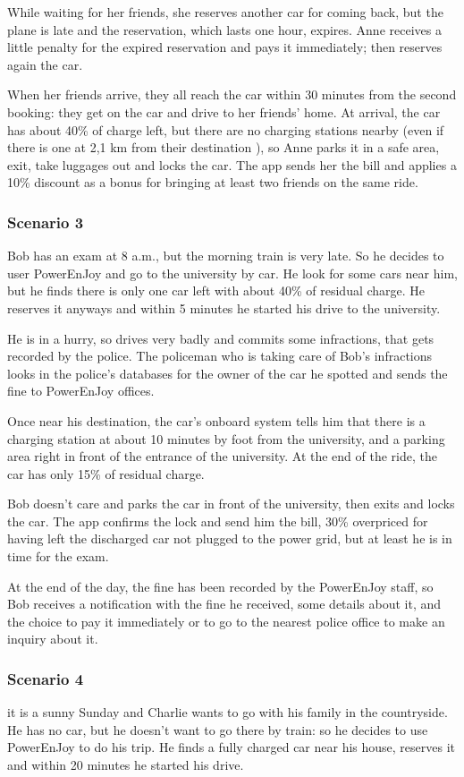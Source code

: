 \documentclass[11pt]{article} %
\newcommand{\pe}{PowerEnJoy }
\begin{document}
While waiting for her friends, she reserves another car for coming back, but the plane is late and the reservation, which lasts one hour, expires. Anne receives a little penalty for the expired reservation and pays it immediately; then reserves again the car.

When her friends arrive, they all reach the car within 30 minutes from the second booking: they get on the car and drive to her friends' home. At arrival, the car has about 40\% of charge left, but there are no charging stations nearby (even if there is one at 2,1 km from their destination ), so Anne parks it in a safe area, exit, take luggages out and locks the car. The app sends her the bill and applies a 10\% discount as a bonus for bringing at least two friends on the same ride.


\subsubsection{Scenario 3}
Bob has an exam at 8 a.m., but the morning train is very late. So he decides to user \pe and go to the university by car. He look for some cars near him, but he finds there is only one car left with about 40\% of residual charge. He reserves it anyways and within 5 minutes he started his drive to the university.

He is in a hurry, so drives very badly and commits some infractions, that gets recorded by the police. The policeman who is taking care of Bob's infractions looks in the police's databases for the owner of the car he spotted and sends the fine to \pe offices.

Once near his destination, the car's onboard system tells him that there is a charging station at about 10 minutes by foot from the university, and a parking area right in front of the entrance of the university. At the end of the ride, the car has only 15\% of residual charge.

Bob doesn't care and parks the car in front of the university, then exits and locks the car. The app confirms the lock and send him the bill, 30\% overpriced for having left the discharged car not plugged to the power grid, but at least he is in time for the exam.

At the end of the day, the fine has been recorded by the \pe staff, so Bob receives a notification with the fine he received, some details about it, and the choice to pay it immediately or to go to the nearest police office to make an inquiry about it.


\subsubsection{Scenario 4}
it is a sunny Sunday and Charlie wants to go with his family in the countryside. He has no car, but he doesn't want to go there by train: so he decides to use \pe to do his trip. He finds a fully charged car near his house, reserves it and within 20 minutes he started his drive.
\end{document}
